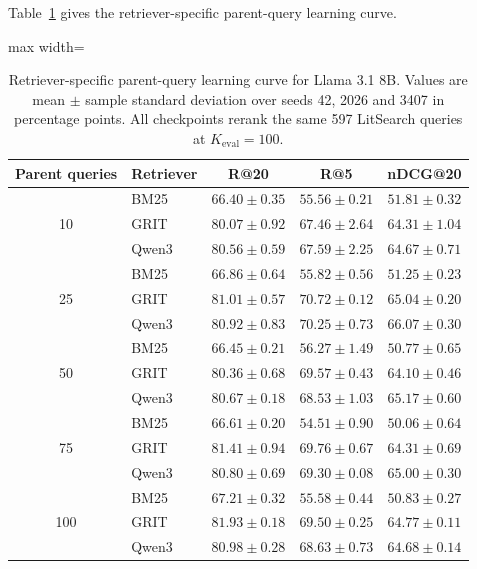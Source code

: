 \documentclass[pdflatex,sn-basic,Numbered]{sn-jnl}%
\theoremstyle{thmstyleone}%
\theoremstyle{thmstyletwo}%
\theoremstyle{thmstylethree}%
\begin{document}
Table~\ref{tab:parent-budget-detailed} gives the retriever-specific parent-query learning curve.

\begin{table}[htbp]


\centering
\scriptsize
\setlength{\tabcolsep}{4.0pt}
\renewcommand{\arraystretch}{1.04}
\begin{adjustbox}{max width=\linewidth}
\begin{tabular}{c l c c c}
\hline
Parent queries & Retriever & R@20 & R@5 & nDCG@20 \\
\hline
\multirow{3}{*}{10}
 & BM25  & $66.40\pm0.35$ & $55.56\pm0.21$ & $51.81\pm0.32$ \\
 & GRIT  & $80.07\pm0.92$ & $67.46\pm2.64$ & $64.31\pm1.04$ \\
 & Qwen3 & $80.56\pm0.59$ & $67.59\pm2.25$ & $64.67\pm0.71$ \\
\hline
\multirow{3}{*}{25}
 & BM25  & $66.86\pm0.64$ & $55.82\pm0.56$ & $51.25\pm0.23$ \\
 & GRIT  & $81.01\pm0.57$ & $70.72\pm0.12$ & $65.04\pm0.20$ \\
 & Qwen3 & $80.92\pm0.83$ & $70.25\pm0.73$ & $66.07\pm0.30$ \\
\hline
\multirow{3}{*}{50}
 & BM25  & $66.45\pm0.21$ & $56.27\pm1.49$ & $50.77\pm0.65$ \\
 & GRIT  & $80.36\pm0.68$ & $69.57\pm0.43$ & $64.10\pm0.46$ \\
 & Qwen3 & $80.67\pm0.18$ & $68.53\pm1.03$ & $65.17\pm0.60$ \\
\hline
\multirow{3}{*}{75}
 & BM25  & $66.61\pm0.20$ & $54.51\pm0.90$ & $50.06\pm0.64$ \\
 & GRIT  & $81.41\pm0.94$ & $69.76\pm0.67$ & $64.31\pm0.69$ \\
 & Qwen3 & $80.80\pm0.69$ & $69.30\pm0.08$ & $65.00\pm0.30$ \\
\hline
\multirow{3}{*}{100}
 & BM25  & $67.21\pm0.32$ & $55.58\pm0.44$ & $50.83\pm0.27$ \\
 & GRIT  & $81.93\pm0.18$ & $69.50\pm0.25$ & $64.77\pm0.11$ \\
 & Qwen3 & $80.98\pm0.28$ & $68.63\pm0.73$ & $64.68\pm0.14$ \\
\hline
\end{tabular}
\end{adjustbox}


\caption{Retriever-specific parent-query learning curve for Llama 3.1 8B.
Values are mean $\pm$ sample standard deviation over seeds 42, 2026 and 3407
in percentage points. All checkpoints rerank the same 597 LitSearch queries at
$K_{\mathrm{eval}}=100$.}
\label{tab:parent-budget-detailed}
\end{table}
\end{document}
